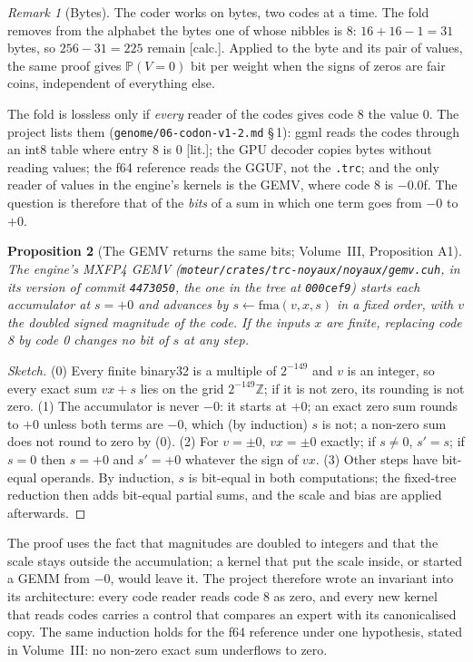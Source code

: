 \documentclass[11pt, a4paper]{article}
\newtheorem{proposition}{Proposition}
\theoremstyle{remark}
\newtheorem{remark}[proposition]{Remark}
\newcommand{\etiq}[1]{\textsf{\scriptsize[#1]}}
\newcommand{\calc}{\etiq{calc.}}
\newcommand{\litt}{\etiq{lit.}}
\newcommand{\fichier}[1]{\textsf{\footnotesize\nolinkurl{#1}}}
\newcommand{\Prob}{\mathbb{P}}
\begin{document}
\begin{remark}[Bytes]\label{rem:octets}
The coder works on bytes, two codes at a time. The fold removes from the alphabet the bytes one of whose nibbles is 8: $16 + 16 - 1 = 31$ bytes, so $256 - 31 = 225$ remain \calc. Applied to the byte and its pair of values, the same proof gives $\Prob(V = 0)$ bit per weight when the signs of zeros are fair coins, independent of everything else.
\end{remark}

The fold is lossless only if \emph{every} reader of the codes gives code 8 the value 0. The project lists them (\fichier{genome/06-codon-v1-2.md} §\,1): ggml reads the codes through an int8 table where entry 8 is 0 \litt; the GPU decoder copies bytes without reading values; the f64 reference reads the GGUF, not the \texttt{.trc}; and the only reader of values in the engine's kernels is the GEMV, where code 8 is $-0.0$f. The question is therefore that of the \emph{bits} of a sum in which one term goes from $-0$ to $+0$.

\begin{proposition}[The GEMV returns the same bits; Volume~III, Proposition A1]\label{prop:a1}
The engine's MXFP4 GEMV (\fichier{moteur/crates/trc-noyaux/noyaux/gemv.cuh}, in its version of commit \texttt{4473050}, the one in the tree at \texttt{000cef9}) starts each accumulator at $s = +0$ and advances by $s \leftarrow \mathrm{fma}(v, x, s)$ in a fixed order, with $v$ the doubled signed magnitude of the code. If the inputs $x$ are finite, replacing code 8 by code 0 changes no bit of $s$ at any step.
\end{proposition}
\begin{proof}[Sketch]
(0) Every finite binary32 is a multiple of $2^{-149}$ and $v$ is an integer, so every exact sum $v x + s$ lies on the grid $2^{-149}\mathbb{Z}$; if it is not zero, its rounding is not zero. (1) The accumulator is never $-0$: it starts at $+0$; an exact zero sum rounds to $+0$ unless both terms are $-0$, which (by induction) $s$ is not; a non-zero sum does not round to zero by (0). (2) For $v = \pm 0$, $v x = \pm 0$ exactly; if $s \neq 0$, $s' = s$; if $s = 0$ then $s = +0$ and $s' = +0$ whatever the sign of $v x$. (3) Other steps have bit-equal operands. By induction, $s$ is bit-equal in both computations; the fixed-tree reduction then adds bit-equal partial sums, and the scale and bias are applied afterwards.
\end{proof}

The proof uses the fact that magnitudes are doubled to integers and that the scale stays outside the accumulation; a kernel that put the scale inside, or started a GEMM from $-0$, would leave it. The project therefore wrote an invariant into its architecture: every code reader reads code 8 as zero, and every new kernel that reads codes carries a control that compares an expert with its canonicalised copy. The same induction holds for the f64 reference under one hypothesis, stated in Volume~III: no non-zero exact sum underflows to zero.
\end{document}
